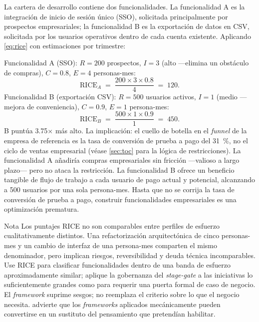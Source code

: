 \begin{example}
La cartera de desarrollo contiene dos funcionalidades. La funcionalidad A es la integración
de inicio de sesión único (SSO), solicitada principalmente por prospectos empresariales;
la funcionalidad B es la exportación de datos en CSV, solicitada por los usuarios operativos
dentro de cada cuenta existente. Aplicando \cref{eq:rice} con estimaciones por trimestre:

\medskip
\noindent Funcionalidad A (SSO): \(R = 200\) prospectos, \(I = 3\) (alto ---elimina un
obstáculo de compras), \(C = 0.8\), \(E = 4\) personas-mes:
\[
  \mathrm{RICE}_A \;=\; \frac{200 \times 3 \times 0.8}{4} \;=\; 120.
\]
Funcionalidad B (exportación CSV): \(R = 500\) usuarios activos, \(I = 1\) (medio ---mejora
de conveniencia), \(C = 0.9\), \(E = 1\) persona-mes:
\[
  \mathrm{RICE}_B \;=\; \frac{500 \times 1 \times 0.9}{1} \;=\; 450.
\]
B puntúa \num{3.75}\(\times\) más alto. La implicación: el cuello de botella en el
\emph{funnel} de la empresa de referencia es la tasa de conversión de prueba a pago del
\qty{31}{\percent}, no el ciclo de ventas empresarial (véase \cref{sec:toc} para la
lógica de restricciones). La funcionalidad A añadiría compras empresariales sin fricción
---valioso a largo plazo--- pero no ataca la restricción. La funcionalidad B ofrece un
beneficio tangible de flujo de trabajo a cada usuario de pago actual y potencial,
alcanzando a \num{500} usuarios por una sola persona-mes. Hasta que no se corrija la
tasa de conversión de prueba a pago, construir funcionalidades empresariales es una
optimización prematura.
\end{example}

\begin{admonition}{Nota}
Los puntajes RICE no son comparables entre perfiles de esfuerzo cualitativamente distintos.
Una refactorización arquitectónica de cinco personas-mes y un cambio de interfaz de una
persona-mes comparten el mismo denominador, pero implican riesgos, reversibilidad y deuda
técnica incomparables. Use RICE para clasificar funcionalidades dentro de una banda de
esfuerzo aproximadamente similar; aplique la gobernanza del \emph{stage-gate} a las
iniciativas lo suficientemente grandes como para requerir una puerta formal de caso de
negocio. El \emph{framework} suprime sesgos; no reemplaza el criterio sobre lo que el
negocio necesita. \textcite{torres2021continuous} advierte que los \emph{frameworks}
aplicados mecánicamente pueden convertirse en un sustituto del pensamiento que
pretendían habilitar.
\end{admonition}

